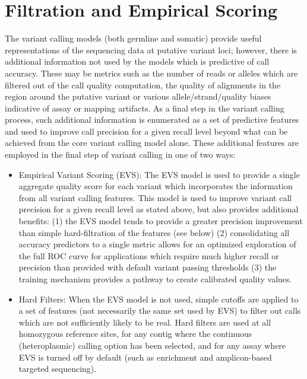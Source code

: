 \documentclass{article}
\begin{document}
\section{Filtration and Empirical Scoring}
\label{sec:FiltrationAndScoring}

The variant calling models (both germline and somatic) provide useful representations of the sequencing data at putative variant loci; however, there is additional information not used by the models which is predictive of call accuracy. These may be metrics such as the number of reads or alleles which are filtered out of the call quality computation, the quality of alignments in the region around the putative variant or various allele/strand/quality biases indicative of assay or mapping artifacts. As a final step in the variant calling process, such additional information is enumerated as a set of predictive features and used to improve call precision for a given recall level beyond what can be achieved from the core variant calling model alone. These additional features are employed in the final step of variant calling in one of two ways:

\begin{itemize}
    \item Empirical Variant Scoring (EVS):
    The EVS model is used to provide a single aggregate quality score for each variant which incorporates the information from all variant calling features. This model is used to improve variant call precision for a given recall level as stated above, but also provides additional benefits: (1) the EVS model tends to provide a greater precision improvement than simple hard-filtration of the features (see below) (2) consolidating all accuracy predictors to a single metric allows for an optimized exploration of the full ROC curve for applications which require much higher recall or precision than provided with default variant passing thresholds (3) the training mechanism provides a pathway to create calibrated quality values.
    \item Hard Filters:
    When the EVS model is not used, simple cutoffs are applied to a set of features (not necessarily the same set used by EVS) to filter out calls which are not sufficiently likely to be real. Hard filters are used at all homozygous reference sites, for any contig where the continuous (heteroplasmic) calling option has been selected, and for any assay where EVS is turned off by default (such as enrichment and amplicon-based targeted sequencing).
\end{itemize}
\end{document}
